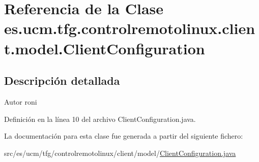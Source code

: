 \hypertarget{classes_1_1ucm_1_1tfg_1_1controlremotolinux_1_1client_1_1model_1_1ClientConfiguration}{\section{Referencia de la Clase es.\-ucm.\-tfg.\-controlremotolinux.\-client.\-model.\-Client\-Configuration}
\label{classes_1_1ucm_1_1tfg_1_1controlremotolinux_1_1client_1_1model_1_1ClientConfiguration}
}


\subsection{Descripción detallada}
\begin{DoxyAuthor}{Autor}
roni 
\end{DoxyAuthor}


Definición en la línea 10 del archivo Client\-Configuration.\-java.



La documentación para esta clase fue generada a partir del siguiente fichero\-:\begin{DoxyCompactItemize}
\item 
src/es/ucm/tfg/controlremotolinux/client/model/\hyperlink{ClientConfiguration_8java}{Client\-Configuration.\-java}\end{DoxyCompactItemize}
